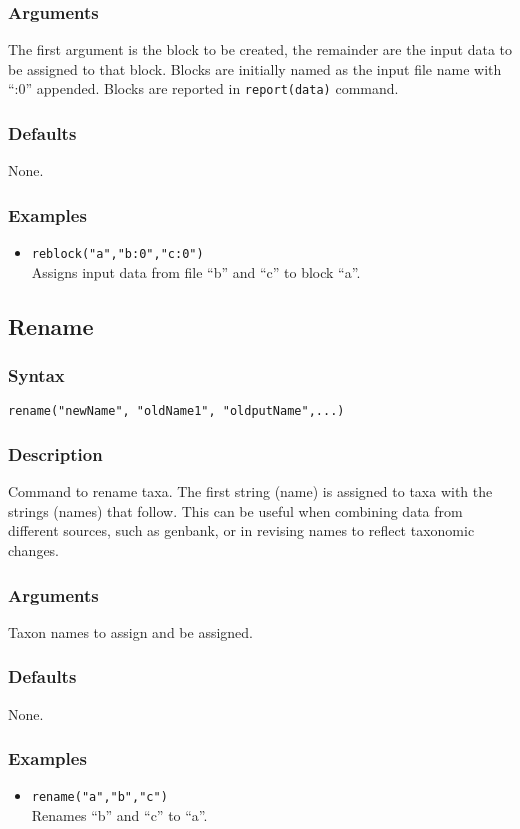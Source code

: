 \documentclass[11pt]{article}
\begin{document}
	\subsubsection{Arguments}
	The first argument is the block to be created, the remainder are the input data to be 
	assigned to that block. Blocks are initially named as the input file name with ``:0'' appended.  Blocks are reported in \texttt{report(data)} command.
	\subsubsection{Defaults}
	None.
	\subsubsection{Examples}
	\begin{itemize}
		\item{\texttt{reblock("a","b:0","c:0")}\\ Assigns input data from file ``b'' and ``c'' to block ``a''. }
	\end{itemize}
	
	
	\subsection{Rename}
		\subsubsection{Syntax}
			\texttt{rename("newName", "oldName1", "oldputName",...)}
		\subsubsection{Description}
			Command to rename taxa.  The first string (name) is assigned to taxa with the strings (names) that follow. This can be useful when combining data from
			different sources, such as genbank, or in revising names to reflect taxonomic changes.
		\subsubsection{Arguments}
			Taxon names to assign and be assigned.
		\subsubsection{Defaults}
			None.
		\subsubsection{Examples}
			 \begin{itemize}
			 	\item{\texttt{rename("a","b","c")}\\ Renames ``b'' and ``c'' to ``a''. }
			\end{itemize}
		
\end{document}
